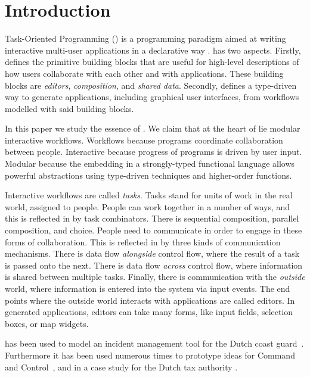 


\section{Introduction}

Task-Oriented Programming (\TOP) is a programming paradigm aimed at writing interactive multi-user applications in a declarative way \cite{conf/ppdp/PlasmeijerLMAK12}.
\TOP has two aspects.
Firstly, \TOP defines the primitive building blocks that are useful for high-level descriptions of how users collaborate with each other and with applications.
These building blocks are \emph{editors}, \emph{composition}, and \emph{shared data}.
Secondly, \TOP defines a type-driven way to generate applications, including graphical user interfaces, from workflows modelled with said building blocks.

In this paper we study the essence of \TOP.
We claim that at the heart of \TOP lie modular interactive workflows.
Workflows because \TOP programs coordinate collaboration between people.
Interactive because progress of \TOP programs is driven by user input.
Modular because the embedding in a strongly-typed functional language allows powerful abstractions using type-driven techniques and higher-order functions.

Interactive workflows are called \emph{tasks}.
Tasks stand for units of work in the real world, assigned to people.
People can work together in a number of ways, and this is reflected in \TOP by task combinators.
There is sequential composition, parallel composition, and choice.
People need to communicate in order to engage in these forms of collaboration.
This is reflected in \TOP by three kinds of communication mechanisms.
There is data flow \emph{alongside} control flow, where the result of a task is passed onto the next.
There is data flow \emph{across} control flow, where information is shared between multiple tasks.
Finally, there is communication with the \emph{outside} world, where information is entered into the system via input events.
The end points where the outside world interacts with \TOP applications are called editors.
In generated applications, editors can take many forms, like input fields, selection boxes, or map widgets.

\TOP has been used to model an incident management tool for the Dutch coast guard~\cite{conf/iscram/LijnseJP12}.
Furthermore it has been used numerous times to prototype ideas for Command and Control~\cite{theses/nlda/Kool17, theses/radboud/Stutterheim17}, and in a case study for the Dutch tax authority \cite{conf/sfp/StutterheimAP17}.



